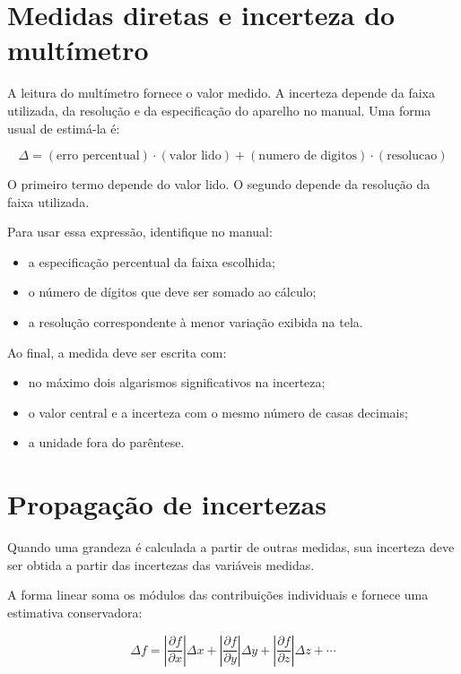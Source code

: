 \documentclass[12pt,a4paper]{article}
\begin{document}
\section{Medidas diretas e incerteza do multímetro}

A leitura do multímetro fornece o valor medido. A incerteza depende da faixa utilizada, da resolução e da especificação do aparelho
no manual. Uma forma usual de estimá-la é:

\begin{equation}
\Delta = (\text{erro percentual}) \cdot (\text{valor lido}) + (\text{numero de digitos}) \cdot (\text{resolucao})
\end{equation}

O primeiro termo depende do valor lido. O segundo depende da resolução da faixa utilizada.

Para usar essa expressão, identifique no manual:

\begin{itemize}
  \item a especificação percentual da faixa escolhida;
  \item o número de dígitos que deve ser somado ao cálculo;
  \item a resolução correspondente à menor variação exibida na tela.
\end{itemize}

Ao final, a medida deve ser escrita com:

\begin{itemize}
  \item no máximo dois algarismos significativos na incerteza;
  \item o valor central e a incerteza com o mesmo número de casas decimais;
  \item a unidade fora do parêntese.
\end{itemize}

\section{Propagação de incertezas}

Quando uma grandeza é calculada a partir de outras medidas, sua incerteza deve ser obtida a partir das incertezas das variáveis
medidas.

A forma linear soma os módulos das contribuições individuais e fornece uma estimativa conservadora:

\begin{equation}
\Delta f =
\left| \frac{\partial f}{\partial x} \right| \Delta x +
\left| \frac{\partial f}{\partial y} \right| \Delta y +
\left| \frac{\partial f}{\partial z} \right| \Delta z + \cdots
\end{equation}
\end{document}
